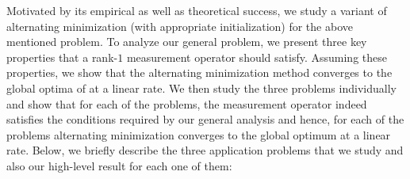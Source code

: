 \documentclass[11pt]{article}
\newcommand{\Tr}{\operatorname{Tr}}
\newcommand{\Wo}{W_*}
\renewcommand{\b}{\bm{b}}
\begin{document}
Motivated by its empirical as well as theoretical success, we  study a variant of alternating minimization  (with appropriate initialization) for the  above mentioned \lrrom problem. To analyze our general \lrrom problem, we present three key properties that a rank-$1$ measurement operator should satisfy. Assuming these properties, we show that the alternating minimization method converges to the global optima of \lrrom at a linear rate. We then study the  three problems individually and show that for each of the problems, the measurement operator indeed satisfies the conditions required by our general analysis and hence, for each of the problems alternating minimization converges to the global optimum at a linear rate. Below, we briefly describe the three application problems that we study and also our high-level result for each one of them: \\[8pt]
\end{document}
